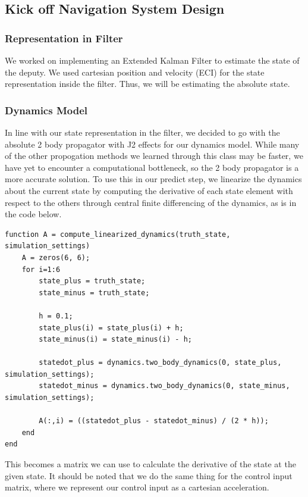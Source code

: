 \subsection{Kick off Navigation System Design}

\subsubsection{Representation in Filter}
We worked on implementing an Extended Kalman Filter to estimate the state of the deputy. We used cartesian position and velocity (ECI) for the state representation inside the filter. Thus, we will be estimating the absolute state.

\subsubsection{Dynamics Model}
In line with our state representation in the filter, we decided to go with the absolute 2 body propagator with J2 effects for our dynamics model. While many of the other propogation methods we learned through this class may be faster, we have yet to encounter a computational bottleneck, so the 2 body propagator is a more accurate solution. To use this in our predict step, we linearize the dynamics about the current state by computing the derivative of each state element with respect to the others through central finite differencing of the dynamics, as is in the code below.

\begin{lstlisting}
function A = compute_linearized_dynamics(truth_state, simulation_settings)
    A = zeros(6, 6);
    for i=1:6
        state_plus = truth_state;
        state_minus = truth_state;

        h = 0.1;
        state_plus(i) = state_plus(i) + h;
        state_minus(i) = state_minus(i) - h;

        statedot_plus = dynamics.two_body_dynamics(0, state_plus, simulation_settings);
        statedot_minus = dynamics.two_body_dynamics(0, state_minus, simulation_settings);

        A(:,i) = ((statedot_plus - statedot_minus) / (2 * h));
    end
end
\end{lstlisting}

This becomes a matrix we can use to calculate the derivative of the state at the given state. It should be noted that we do the same thing for the control input matrix, where we represent our control input as a cartesian acceleration.

